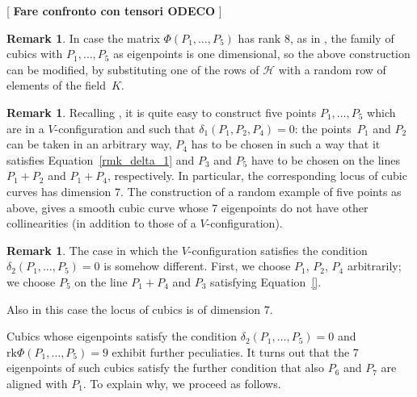 \documentclass{amsart}
\theoremstyle{plain}
\theoremstyle{definition}
\newtheorem{rmk}[lemma]{Remark}
\newcommand{\blue}[1]{{\color{blue}  [#1]}}
\newcommand{\rk}{\ensuremath{\mathrm{rk}}}
\begin{document}
\blue{
\textbf{Fare confronto con tensori ODECO}
}

\begin{rmk}
In case the matrix $\Phi(P_1, \dots, P_5)$ has rank $8$, as in , the family of
cubics with $P_1, \dots, P_5$ as eigenpoints is one dimensional, so the
above construction can be modified, by substituting one of the rows of
$\mathcal{H}$ with a random row of elements of the field~$K$.
\end{rmk}

\begin{rmk}
\label{rmk:construction_five_d1}
Recalling , it is quite easy to construct five points $P_1, \dots, P_5$ which are in a $V$-configuration
and such that $\delta_1(P_1, P_2, P_4)= 0$: the points~$P_1$
and $P_2$ can be taken in an arbitrary way, $P_4$ has to be chosen in such
a way that it satisfies Equation~\eqref{rmk_delta_1}
and $P_3$ and $P_5$ have to be chosen on the lines $P_1+P_2$ and $P_1+P_4$,
respectively. In particular, the corresponding locus of cubic curves
has dimension $7$.
The construction of a random example
of five points as above, gives a smooth cubic curve whose $7$ eigenpoints
do not have other collinearities (in addition to those of a
$V$-configuration).
\end{rmk}

\begin{rmk}
\label{rmk:construction_five_d2}
The case in which the $V$-configuration satisfies the condition
$\delta_2(P_1, \dots, P_5) = 0$ is somehow different.
First, we choose $P_1$, $P_2$, $P_4$ arbitrarily; we choose $P_5$ on the line $P_1 + P_4$ and $P_3$ satisfying Equation~\eqref{}.

Also in this case the locus of cubics is of dimension $7$.
\end{rmk}

Cubics whose eigenpoints satisfy the condition $\delta_2(P_1, \dotsc, P_5) = 0$ and $\rk \Phi(P_1, \dotsc, P_5) = 9$ exhibit further peculiaties. It turns out that the $7$ eigenpoints of such cubics satisfy the further
condition that also $P_6$ and $P_7$ are aligned with $P_1$. To explain
why, we proceed as follows.
\end{document}
